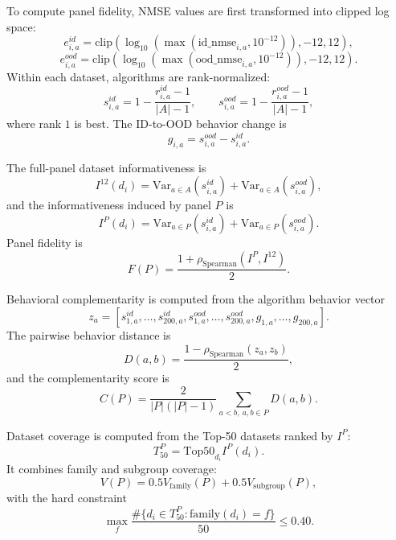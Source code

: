 To compute panel fidelity, NMSE values are first transformed into clipped log space:
\[
e^{id}_{i,a}
=
\mathrm{clip}
\left(
\log_{10}(\max(\mathrm{id\_nmse}_{i,a},10^{-12})),
-12,
12
\right),
\]
\[
e^{ood}_{i,a}
=
\mathrm{clip}
\left(
\log_{10}(\max(\mathrm{ood\_nmse}_{i,a},10^{-12})),
-12,
12
\right).
\]
Within each dataset, algorithms are rank-normalized:
\[
s^{id}_{i,a}
=
1-\frac{r^{id}_{i,a}-1}{|A|-1},
\qquad
s^{ood}_{i,a}
=
1-\frac{r^{ood}_{i,a}-1}{|A|-1},
\]
where rank \(1\) is best. The ID-to-OOD behavior change is
\[
g_{i,a}=s^{ood}_{i,a}-s^{id}_{i,a}.
\]

The full-panel dataset informativeness is
\[
I^{12}(d_i)
=
\mathrm{Var}_{a\in A}(s^{id}_{i,a})
+
\mathrm{Var}_{a\in A}(s^{ood}_{i,a}),
\]
and the informativeness induced by panel \(P\) is
\[
I^P(d_i)
=
\mathrm{Var}_{a\in P}(s^{id}_{i,a})
+
\mathrm{Var}_{a\in P}(s^{ood}_{i,a}).
\]
Panel fidelity is
\[
F(P)
=
\frac{1+\rho_{\mathrm{Spearman}}(I^P,I^{12})}{2}.
\]

Behavioral complementarity is computed from the algorithm behavior vector
\[
z_a=
[
s^{id}_{1,a},\ldots,s^{id}_{200,a},
s^{ood}_{1,a},\ldots,s^{ood}_{200,a},
g_{1,a},\ldots,g_{200,a}
].
\]
The pairwise behavior distance is
\[
D(a,b)
=
\frac{1-\rho_{\mathrm{Spearman}}(z_a,z_b)}{2},
\]
and the complementarity score is
\[
C(P)
=
\frac{2}{|P|(|P|-1)}
\sum_{a<b,\ a,b\in P}D(a,b).
\]

Dataset coverage is computed from the Top-50 datasets ranked by \(I^P\):
\[
T^P_{50}
=
\mathrm{Top50}_{d_i} I^P(d_i).
\]
It combines family and subgroup coverage:
\[
V(P)
=
0.5V_{\mathrm{family}}(P)
+
0.5V_{\mathrm{subgroup}}(P),
\]
with the hard constraint
\[
\max_f
\frac{
\#\{d_i\in T^P_{50}:\mathrm{family}(d_i)=f\}
}{50}
\le 0.40.
\]

